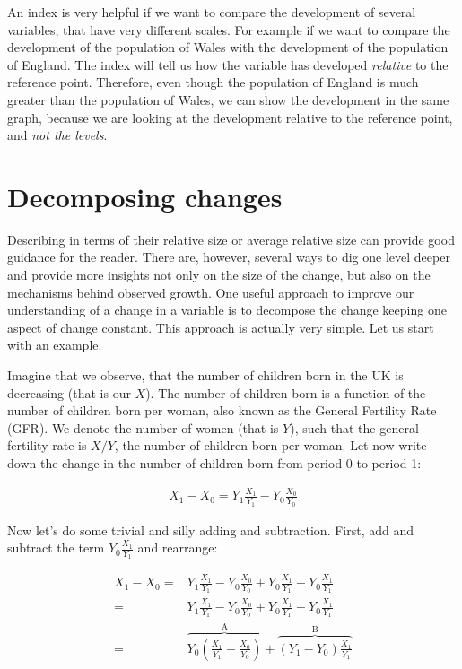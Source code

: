 \documentclass[
]{book}
\begin{document}
An index is very helpful if we want to compare the development of several variables, that have very different scales. For example if we want to compare the development of the population of Wales with the development of the population of England. The index will tell us how the variable has developed \emph{relative} to the reference point. Therefore, even though the population of England is much greater than the population of Wales, we can show the development in the same graph, because we are looking at the development relative to the reference point, and \emph{not the levels}.

\hypertarget{decomposing-changes}{%
\section{Decomposing changes}\label{decomposing-changes}}

Describing in terms of their relative size or average relative size can provide good guidance for the reader. There are, however, several ways to dig one level deeper and provide more insights not only on the size of the change, but also on the mechanisms behind observed growth. One useful approach to improve our understanding of a change in a variable is to decompose the change keeping one aspect of change constant. This approach is actually very simple. Let us start with an example.

Imagine that we observe, that the number of children born in the UK is decreasing (that is our \(X\)). The number of children born is a function of the number of children born per woman, also known as the General Fertility Rate (GFR). We denote the number of women (that is \(Y\)), such that the general fertility rate is \(X/Y\), the number of children born per woman. Let now write down the change in the number of children born from period 0 to period 1:

\begin{align}
   X_1-X_0=Y_1\frac{X_1}{Y_1}-Y_0\frac{X_0}{Y_0}
 \end{align}

Now let's do some trivial and silly adding and subtraction. First, add and subtract the term \(Y_0\frac{X_1}{Y_1}\) and rearrange:

\begin{align}
   X_1-X_0=&Y_1\frac{X_1}{Y_1}-Y_0\frac{X_0}{Y_0}+Y_0\frac{X_1}{Y_1}-Y_0\frac{X_1}{Y_1}\nonumber\\
        =&Y_1\frac{X_1}{Y_1}-Y_0\frac{X_0}{Y_0}+Y_0\frac{X_1}{Y_1}-Y_0\frac{X_1}{Y_1}\nonumber\\
        =&\overbrace{Y_0\left(\frac{X_1}{Y_1}-\frac{X_0}{Y_0}\right)}^{\text{A}}+\overbrace{(Y_1-Y_0)\frac{X_1}{Y_1}}^{\text{B}}\nonumber
\end{align}
\end{document}
